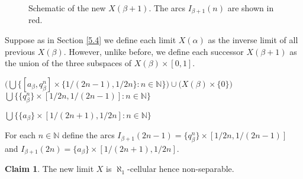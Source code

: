 \documentclass[12pt]{article}
\theoremstyle{plain}
\theoremstyle{definition}
\newcounter{claim5counter}
\newtheorem{claim5}[claim5counter]{Claim}
\newcommand{\A}{\ensuremath{\alpha}}
\newcommand{\B}{\ensuremath{\beta}}
\newcommand{\NN}{\ensuremath{\mathbb N}}
\newcommand{\0}{\ensuremath{\varnothing}}
\begin{document}
\begin{figure}[!h]
		
		\vspace{0.5cm}
		
		\caption{Schematic of the new $X(\B+1)$. The arcs $I_{\B+1}(n)$ are shown in red.}\label{SeparablyBellamySuccessorArcs1Input}
		
	\end{figure}
	
	
	Suppose as in Section \ref{5.4} we define each limit $X(\A)$ as the inverse limit of all previous $X(\B)$.
	However, unlike before, we define each successor $X(\B +1)$ as the union of the three subspaces of $X(\B) \times [0,1]$.
	
	
	\begin{center}
		$ \big ( \bigcup \big \{ [a_\B,q^n_\B] \times \{1/(2n-1),1/2n\} : n \in \NN \big \} \big ) \cup \big ( X(\B) \times \{0\} \big )$
		$\bigcup \big \{ \{q^n_\B\} \times [1/2n, 1/(2n-1)] : n \in \NN \big \}$
		
		$\bigcup \big \{ \{a_\B\} \times [1/(2n+1), 1/2n] : n \in \NN \big \}$
	\end{center}
	
	For each $n \in \NN$ define the arcs $I_{\B+1}({2n-1}) = \{q^n_\B\} \times [1/2n, 1/(2n-1)]$ 
	and $I_{\B+1}(2n) = \{a_\B\} \times [1/(2n+1), 1/2n]$.
	
	
	\begin{claim5}\label{notsep}
		The new limit $X$ is $\aleph_1$-cellular hence non-separable.
	\end{claim5}
	
\end{document}
